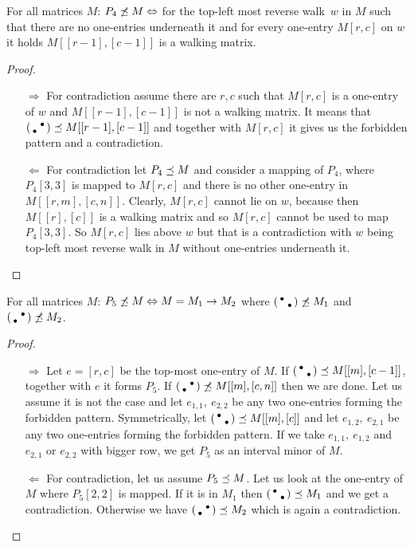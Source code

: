 \begin{prop}
For all matrices $M$: $P_4\not\preceq M\Leftrightarrow$ for the top-left most reverse walk~$w$ in $M$ such that there are no one-entries underneath it and for every one-entry $M[r,c]$ on $w$ it holds $M[[r-1],[c-1]]$ is a walking matrix.
\end{prop}
\begin{proof}
\begin{itemize}
	\item[$\Rightarrow$] For contradiction assume there are $r,c$ such that $M[r,c]$ is a one-entry of $w$ and $M[[r-1],[c-1]]$ is not a walking matrix. It means that $\left(\begin{smallmatrix} &\bullet\\\bullet& \end{smallmatrix}\right)\preceq M[[r-1],[c-1]]$ and together with $M[r,c]$ it gives us the forbidden pattern and a contradiction.
	\item[$\Leftarrow$] For contradiction let $P_4\preceq M$ and consider a mapping of $P_4$, where $P_4[3,3]$ is mapped to $M[r,c]$ and there is no other one-entry in $M[[r,m],[c,n]]$. Clearly, $M[r,c]$ cannot lie on $w$, because then $M[[r],[c]]$ is a walking matrix and so $M[r,c]$ cannot be used to map $P_4[3,3]$. So $M[r,c]$ lies above $w$ but that is a contradiction with $w$ being top-left most reverse walk in $M$ without one-entries underneath it.
\end{itemize}
\end{proof}

\begin{prop}
For all matrices $M$: $P_5\not\preceq M\Leftrightarrow M=M_1\rightarrow M_2$ where $\left(\begin{smallmatrix}\bullet& \\ &\bullet\end{smallmatrix}\right)\not\preceq M_1$ and $\left(\begin{smallmatrix} &\bullet\\\bullet& \end{smallmatrix}\right)\not\preceq M_2$.
\end{prop}
\begin{proof}
\begin{itemize}
	\item[$\Rightarrow$] Let $e=[r,c]$ be the top-most one-entry of $M$. If $\left(\begin{smallmatrix}\bullet& \\ &\bullet\end{smallmatrix}\right)\preceq M[[m],[c-1]]$, together with $e$ it forms $P_5$. If $\left(\begin{smallmatrix} &\bullet\\\bullet& \end{smallmatrix}\right)\not\preceq M[[m],[c,n]]$ then we are done. Let us assume it is not the case and let $e_{1,1},\ e_{2,2}$ be any two one-entries forming the forbidden pattern. Symmetrically, let $\left(\begin{smallmatrix}\bullet& \\ &\bullet\end{smallmatrix}\right)\preceq M[[m],[c]]$ and let $e_{1,2},\ e_{2,1}$ be any two one-entries forming the forbidden pattern. If we take $e_{1,1},\ e_{1,2}$ and $e_{2,1}$ or $e_{2,2}$ with bigger row, we get $P_5$ as an interval minor of $M$. 
	\item[$\Leftarrow$] For contradiction, let us assume $P_5\preceq M$. Let us look at the one-entry of $M$ where $P_5[2,2]$ is mapped. If it is in $M_1$ then $\left(\begin{smallmatrix}\bullet& \\ &\bullet\end{smallmatrix}\right)\preceq M_1$ and we get a contradiction. Otherwise we have $\left(\begin{smallmatrix} &\bullet\\\bullet& \end{smallmatrix}\right)\preceq M_2$ which is again a contradiction.
\end{itemize}
\end{proof}

